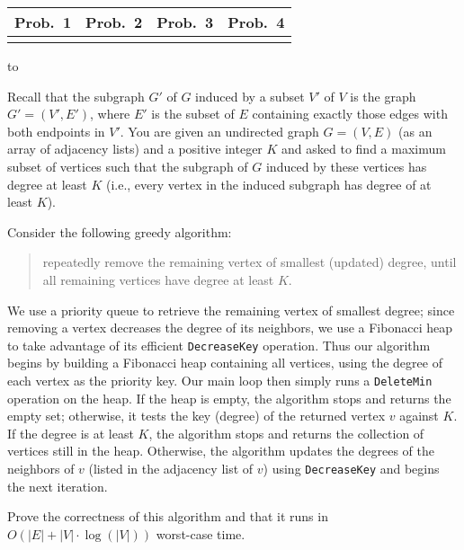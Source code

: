 \documentclass[a4paper,11pt]{book}
\newcounter{problem}
\begin{document}
\begin{center}
  \LARGE\sf
  \begin{tabular}{||c|c|c|c||}
    \hline\hline
    Prob.~1 & Prob.~2 & Prob.~3 & Prob.~4 \\
    \hline
    &&&\\
    \hline\hline
  \end{tabular}
\end{center}
\bigskip\bigskip

\addtocounter{problem}{1}
\hbox to

\bigskip\noindent
Recall that the subgraph $G'$ of $G$ induced by a subset $V'$ of $V$ is
the graph $G'=(V',E')$, where $E'$ is the subset of $E$ containing exactly
those edges with both endpoints in $V'$.
You are given an undirected graph $G=(V, E)$ (as an array of adjacency lists)
and a positive integer $K$
and asked to find a maximum subset of vertices such that the subgraph
of $G$ induced by these vertices has degree at least $K$ (i.e., every vertex
in the induced subgraph has degree of at least $K$).

Consider the following greedy algorithm:
\begin{quote}
  \sf
  repeatedly remove the remaining vertex of smallest (updated) degree,
  until all remaining vertices have degree at least $K$.
\end{quote}
We use a priority queue to retrieve the remaining vertex of smallest degree;
since removing a vertex decreases the degree of its neighbors, we use a
Fibonacci heap to take advantage of its efficient \texttt{DecreaseKey}
operation.  Thus our algorithm begins by building a Fibonacci heap containing
all vertices, using the degree of each vertex as the priority key.
Our main loop then simply runs a \texttt{DeleteMin} operation on the heap.
If the heap is empty, the algorithm stops and returns the empty set;
otherwise, it tests the key (degree) of the returned vertex $v$ against $K$.
If the degree is at least $K$, the algorithm stops and returns the collection
of vertices still in the heap.  Otherwise, the algorithm updates the degrees
of the neighbors of $v$ (listed in the adjacency list of $v$) using
\texttt{DecreaseKey} and begins the next iteration.

Prove the correctness of this algorithm and that it runs in
$O(|E|+|V|\cdot\log(|V|))$ worst-case time.


\medskip

\end{document}
